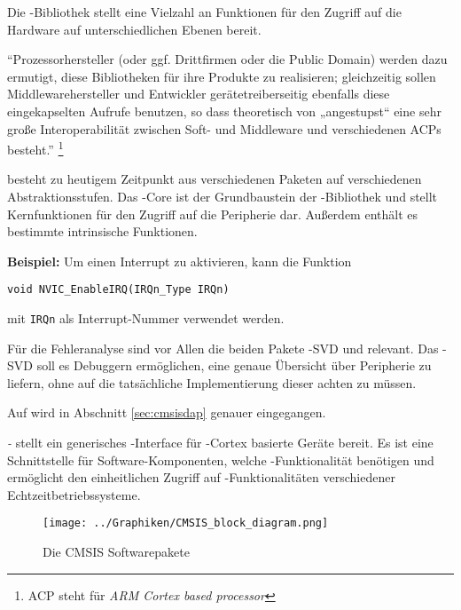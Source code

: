     Die -Bibliothek stellt eine Vielzahl an Funktionen für den Zugriff auf die Hardware auf unterschiedlichen
    Ebenen bereit.

    ``Prozessorhersteller (oder ggf. Drittfirmen oder die Public Domain) werden dazu ermutigt, diese Bibliotheken für
    ihre Produkte zu realisieren; gleichzeitig sollen Middlewarehersteller und Entwickler gerätetreiberseitig ebenfalls
    diese eingekapselten Aufrufe benutzen, so dass theoretisch von  „angestupst“ eine sehr große Interoperabilität
    zwischen Soft- und Middleware und verschiedenen ACPs besteht.''
    \footnote{ACP steht für \textit{ARM Cortex based processor}}
    \citep[Kap.~2.1]{Asche2017}

     besteht zu heutigem Zeitpunkt aus verschiedenen Paketen auf verschiedenen Abstraktionsstufen.
    Das -Core ist der Grundbaustein der -Bibliothek und stellt Kernfunktionen für den Zugriff auf die
    Peripherie dar. Außerdem enthält es bestimmte intrinsische Funktionen.

    \textbf{Beispiel:} Um einen Interrupt zu aktivieren, kann die Funktion
    \begin{lstlisting}
void NVIC_EnableIRQ(IRQn_Type IRQn)
    \end{lstlisting}
    mit \texttt{IRQn} als Interrupt-Nummer verwendet werden.

    Für die Fehleranalyse sind vor Allen die beiden Pakete -SVD und  relevant.
    Das -SVD soll es Debuggern ermöglichen, eine genaue Übersicht über Peripherie zu liefern, ohne auf
    die tatsächliche Implementierung dieser achten zu müssen.

    Auf  wird in Abschnitt \ref{sec:cmsisdap} genauer eingegangen.

    \textit{\hyp{}} stellt ein generisches \hyp{}Interface für -Cortex basierte Geräte bereit.
    Es ist eine Schnittstelle für Software-Komponenten, welche -Funktionalität benötigen und ermöglicht den
    einheitlichen Zugriff auf \hyp{}Funktionalitäten verschiedener Echtzeitbetriebssysteme.

    \begin{figure}[h]
    	\caption{Die CMSIS Softwarepakete}
    	\label{fig:cmsis_packages}
        \centering
        \texttt{[image: ../Graphiken/CMSIS\_block\_diagram.png]}
    \end{figure}


